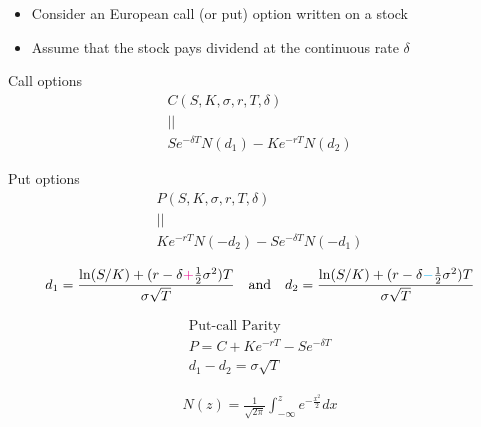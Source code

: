 \begin{frame}[fragile,t]
	\begin{itemize}
		\item Consider an European call (or put) option written on a stock
		\item Assume that the stock pays dividend at the continuous rate $\delta$
	\end{itemize}
	\pause
	\vfill
	\mySeparateLine

	\begin{minipage}{0.48\textwidth}
	\begin{center}
		Call options
		\begin{gather*}
			C(S,K,\sigma,r,T,\delta) \\ || \\
			S e^{-\delta T}N(d_1)-K e^{-rT}N(d_2)
		\end{gather*}
	\end{center}
	\end{minipage}
	\begin{minipage}{0.48\textwidth}
	\begin{center}
		Put options
		\begin{gather*}
			P(S,K,\sigma,r,T,\delta) \\ || \\
			K e^{-rT}N(-d_2) - S e^{-\delta T}N(-d_1)
		\end{gather*}
	\end{center}
	\end{minipage}
	\bigskip
	\bigskip

	\begin{equation*}
		d_1=\frac{\ln(S/K)+(r-\delta\textcolor{magenta}{+}\frac{1}{2}\sigma^2)T}{\sigma \sqrt{T}} \quad \text{and} \quad
		d_2=\frac{\ln(S/K)+(r-\delta\textcolor{cyan}{-}\frac{1}{2}\sigma^2)T}{\sigma \sqrt{T}}
	\end{equation*}

	\mySeparateLine

	\begin{gather*}
		\text{Put-call Parity}\\
		P = C + Ke^{-rT} - S e^{-\delta T} \\[1em]
		d_1-d_2=\sigma \sqrt{T}
	\end{gather*}
	\bigskip
\end{frame}
\begin{frame}[fragile,t]
	\begin{align*}
		N(z) = \frac{1}{\sqrt{2\pi}} \int_{-\infty}^z e^{-\frac{x^2}{2}} dx
	\end{align*}
\end{frame}
